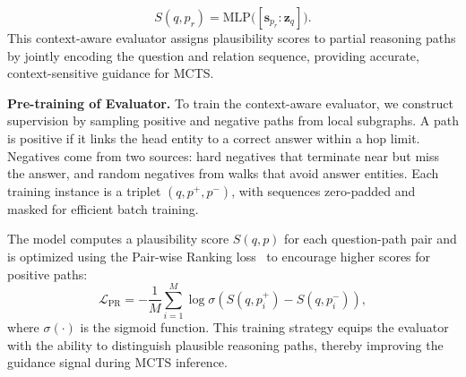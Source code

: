 \begin{equation}
S(q, p_r) = \mathrm{MLP}\big([\mathbf{s}_{p_r}:\mathbf{z}_q]\big).    
\end{equation}
This context-aware evaluator assigns plausibility scores to partial reasoning paths by jointly encoding the question and relation sequence, providing accurate, context-sensitive guidance for MCTS.


\textbf{Pre-training of Evaluator.} To train the context-aware evaluator, we construct supervision by sampling positive and negative paths from local subgraphs. A path is positive if it links the head entity to a correct answer within a hop limit. Negatives come from two sources: hard negatives that terminate near but miss the answer, and random negatives from walks that avoid answer entities. Each training instance is a triplet $(q, p^+, p^-)$, with sequences zero-padded and masked for efficient batch training.

The model computes a plausibility score $S(q, p)$ for each question-path pair and is optimized using the Pair-wise Ranking loss~\citep{rendle2012bpr} to encourage higher scores for positive paths:
\begin{equation}
\label{pr}
    \mathcal{L}_{\text{PR}} = -\frac{1}{M} \sum_{i=1}^M \log \sigma\left( S(q, p^+_i) - S(q, p^-_i) \right),
\end{equation}
where $\sigma(\cdot)$ is the sigmoid function. This training strategy equips the evaluator with the ability to distinguish plausible reasoning paths, thereby improving the guidance signal during MCTS inference.



